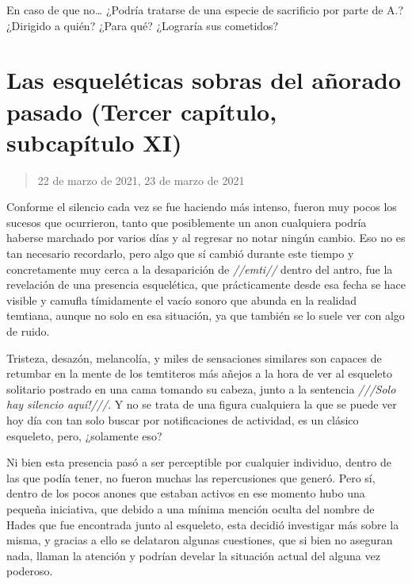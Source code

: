 \documentclass[
  spanish,
]{book}
\begin{document}
En caso de que no\ldots{} ¿Podría tratarse de una especie de sacrificio por parte de A.? ¿Dirigido a quién? ¿Para qué? ¿Lograría sus cometidos?

\hypertarget{las-esqueluxe9ticas-sobras-del-auxf1orado-pasado-tercer-capuxedtulo-subcapuxedtulo-xi}{%
\section{Las esqueléticas sobras del añorado pasado (Tercer capítulo, subcapítulo XI)}\label{las-esqueluxe9ticas-sobras-del-auxf1orado-pasado-tercer-capuxedtulo-subcapuxedtulo-xi}}

\begin{quote}
22 de marzo de 2021, 23 de marzo de 2021
\end{quote}

Conforme el silencio cada vez se fue haciendo más intenso, fueron muy pocos los sucesos que ocurrieron, tanto que posiblemente un anon cualquiera podría haberse marchado por varios días y al regresar no notar ningún cambio. Eso no es tan necesario recordarlo, pero algo que sí cambió durante este tiempo y concretamente muy cerca a la desaparición de \emph{//emti//} dentro del antro, fue la revelación de una presencia esquelética, que prácticamente desde esa fecha se hace visible y camufla tímidamente el vacío sonoro que abunda en la realidad temtiana, aunque no solo en esa situación, ya que también se lo suele ver con algo de ruido.

Tristeza, desazón, melancolía, y miles de sensaciones similares son capaces de retumbar en la mente de los temtiteros más añejos a la hora de ver al esqueleto solitario postrado en una cama tomando su cabeza, junto a la sentencia \emph{///Solo hay silencio aquí!///}. Y no se trata de una figura cualquiera la que se puede ver hoy día con tan solo buscar por notificaciones de actividad, es un clásico esqueleto, pero, ¿solamente eso?

Ni bien esta presencia pasó a ser perceptible por cualquier individuo, dentro de las que podía tener, no fueron muchas las repercusiones que generó. Pero sí, dentro de los pocos anones que estaban activos en ese momento hubo una pequeña iniciativa, que debido a una mínima mención oculta del nombre de Hades que fue encontrada junto al esqueleto, esta decidió investigar más sobre la misma, y gracias a ello se delataron algunas cuestiones, que si bien no aseguran nada, llaman la atención y podrían develar la situación actual del alguna vez poderoso.
\end{document}
